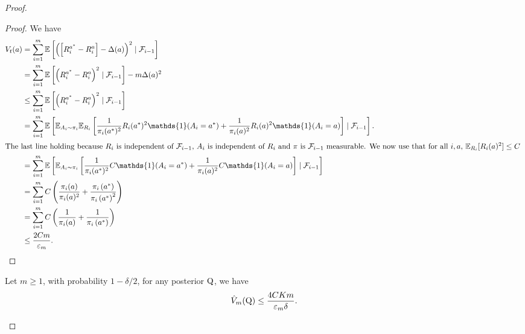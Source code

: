 \begin{noaddcontents}
\begin{proof}
\begin{proof} We have
\begin{align*}
V_t(a) &=\sum_{i=1}^m \mathbb{E}\left[\left(\left[R_i^{a^*}-R_i^a\right]-\Delta(a)\right)^2 \mid \mathcal{F}_{i-1}\right] \\
&=\sum_{i=1}^m \mathbb{E}\left[\left(R_i^{a^*}-R_i^a\right)^2 \mid \mathcal{F}_{i-1}\right]-m \Delta(a)^2\\
& \leq \sum_{i=1}^m \mathbb{E}\left[\left(R_i^{a^*}-R_i^a\right)^2 \mid \mathcal{F}_{i-1}\right]  \\
&  = \sum_{i=1}^m \mathbb{E}\left[\mathbb{E}_{A_i\sim \pi_i}\mathbb{E}_{R_i}\left[\frac{1}{\pi_i(a^*)^2} R_i(a^*)^2\mathds{1}(A_i=a^*) +\frac{1}{\pi_i(a)^2}R_i(a)^2\mathds{1}(A_i=a) \right] \mid \mathcal{F}_{i-1}\right].\\
\intertext{The last line holding because $R_i$ is independent of $\mathcal{F}_{i-1}$, $A_i$ is independent of $R_i$ and $\pi$ is $\mathcal{F}_{i-1}$ measurable.
We now use that for all $i,a$, $\mathbb{E}_{R_i}[R_i(a)^2] \leq C$ }
& = \sum_{i=1}^m \mathbb{E}\left[\mathbb{E}_{A_i\sim \pi_i}
\left[\frac{1}{\pi_i(a^*)^2} C\mathds{1}(A_i=a^*) +\frac{1}{\pi_i(a)^2}C\mathds{1}(A_i=a) \right] \mid \mathcal{F}_{i-1}\right]\\
& =\sum_{i=1}^m C\left(\frac{\pi_i(a)}{\pi_i(a)^2}+\frac{\pi_i\left(a^*\right)}{\pi_i\left(a^*\right)^2}\right) \\ &=\sum_{i=1}^m C\left(\frac{1}{\pi_i(a)}+\frac{1}{\pi_i\left(a^*\right)} \right) \\
& \leq \frac{2C m}{\varepsilon_m}.
\end{align*}
\end{proof}


\begin{lemma}
\label{l: bandit_lemma_2}
Let $m\geq 1$, with probability $1-\delta/2$, for any posterior $\mathrm{Q}$, we have
\[ \hat{V}_m(\mathrm{Q}) \leq \frac{4CKm}{\varepsilon_m\delta}. \]
\end{lemma}


\end{proof}
\end{noaddcontents}
